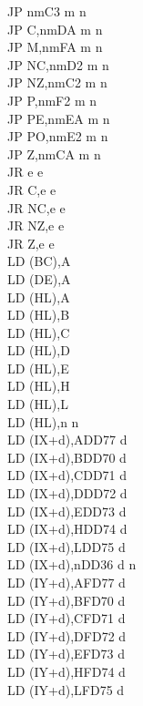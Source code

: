 \begin{multicols}{3}
{\begin{tabbing}
        JP nm\>C3 m n\\
        JP C,nm\>DA m n\\
        JP M,nm\>FA m n\\
        JP NC,nm\>D2 m n\\
        JP NZ,nm\>C2 m n\\
        JP P,nm\>F2 m n\\
        JP PE,nm\>EA m n\\
        JP PO,nm\>E2 m n\\
        JP Z,nm\>CA m n\\
        JR e e\\
        JR C,e e\\
        JR NC,e e\\
        JR NZ,e e\\
        JR Z,e e\\
        LD (BC),A\\
        LD (DE),A\\
        LD (HL),A\\
        LD (HL),B\\
        LD (HL),C\\
        LD (HL),D\\
        LD (HL),E\\
        LD (HL),H\\
        LD (HL),L\\
        LD (HL),n n\\
        LD (IX+d),A\>DD77 d\\
        LD (IX+d),B\>DD70 d\\
        LD (IX+d),C\>DD71 d\\
        LD (IX+d),D\>DD72 d\\
        LD (IX+d),E\>DD73 d\\
        LD (IX+d),H\>DD74 d\\
        LD (IX+d),L\>DD75 d\\
        LD (IX+d),n\>DD36 d n\\
        LD (IY+d),A\>FD77 d\\
        LD (IY+d),B\>FD70 d\\
        LD (IY+d),C\>FD71 d\\
        LD (IY+d),D\>FD72 d\\
        LD (IY+d),E\>FD73 d\\
        LD (IY+d),H\>FD74 d\\
        LD (IY+d),L\>FD75 d\\

\end{tabbing}}
\end{multicols}
